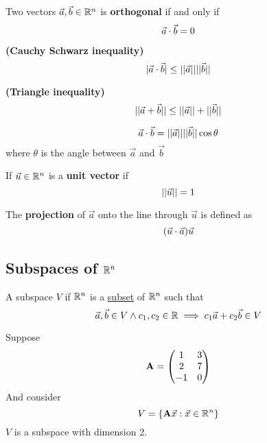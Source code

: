 \documentclass[]{article}
\begin{document}
        \begin{defn}
            Two vectors $\vec{a}, \vec{b} \in \mathbb{R}^n$ is \textbf{orthogonal} if and only if
            \[
                \vec{a} \cdot \vec{b} = 0
            \]
        \end{defn}
        
        \begin{theorem}
            \textbf{(Cauchy Schwarz inequality)}
            \[
                | \vec{a} \cdot \vec{b} | \leq \vert \vert \vec{{a}} \vert \vert \vert \vert \vec{{b}} \vert \vert
            \]
        \end{theorem}
        
        \begin{theorem}
        \textbf{(Triangle inequality)}
            \[
                \vert \vert {\vec{a} + \vec{b}} \vert \vert \leq \vert \vert \vec{{a}} \vert \vert + \vert \vert \vec{{b}} \vert \vert
            \]
        \end{theorem}
        
        \begin{theorem}
            \[
                \vec{a} \cdot \vec{b} = \vert \vert \vec{{a}} \vert \vert \vert \vert \vec{{b}} \vert \vert \cos{\theta}
            \]
            where $\theta$ is the angle between $\vec{a}$ and $\vec{b}$
        \end{theorem}
        
        \begin{defn}
            If $\vec{u} \in \mathbb{R}^n$ is a \textbf{unit vector} if  
            \[
                \vert \vert \vec{{u}} \vert \vert = 1
            \]
        \end{defn}
        
        \begin{defn}
            The \textbf{projection} of $\vec{a}$ onto the line through $\vec{u}$ is defined as 
            \[
                (\vec{u} \cdot \vec{a})\vec{u}
            \]
        \end{defn}
        
        \subsection{Subspaces of $\mathbb{R}^n$}
        \begin{defn}
            A subspace $V$ if $\mathbb{R}^n$ is a \ul{subset} of $\mathbb{R}^n$ such that
            \[
                \vec{a}, \vec{b} \in V \land
                c_1, c_2 \in \mathbb{R}
                \implies c_1 \vec{a} + c_2 \vec{b} \in V
            \]
        \end{defn}
        
        \begin{example}
            Suppose
            \[
                \textbf{A} = \begin{pmatrix}
                    1 & 3 \\
                    2 & 7 \\
                    -1 & 0 \\
                \end{pmatrix}
            \]
            And consider 
            \[
                V = \{\textbf{A} \vec{x}: \vec{x} \in \mathbb{R}^n\}
            \]
            $V$ is a subspace with dimension 2.
        \end{example}
        
\end{document}

